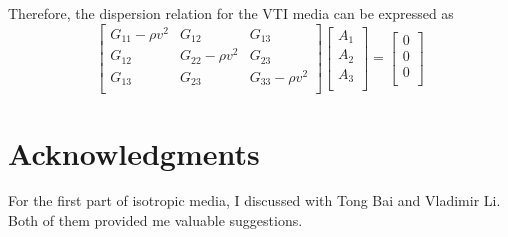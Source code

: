 \documentclass[referee]{../../../texCls/mayWithTeaser}
\begin{document}
Therefore, the dispersion relation for the VTI media can be expressed as
\begin{equation}
  \left[\begin{matrix}
      G_{11}-\rho v^2 & G_{12} & G_{13}\\
      G_{12} & G_{22}-\rho v^2 & G_{23}\\
      G_{13} & G_{23} & G_{33}-\rho v^2\\
  \end{matrix}\right]
  \left[\begin{matrix}
      A_1\\
      A_2\\
      A_3\\
  \end{matrix}\right]
  =
  \left[\begin{matrix}
      0\\
      0\\
      0\\
  \end{matrix}\right]
\end{equation}
\section*{Acknowledgments}
For the first part of isotropic media, I discussed with Tong Bai and Vladimir
Li. Both of them provided me valuable suggestions.
\end{document}
